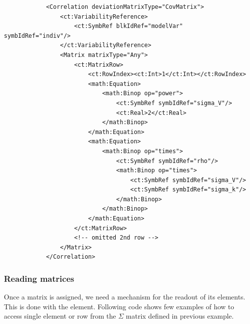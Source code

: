 \lstset{language=XML}
\begin{lstlisting}
            <Correlation deviationMatrixType="CovMatrix">
                <ct:VariabilityReference>
                    <ct:SymbRef blkIdRef="modelVar" symbIdRef="indiv"/>
                </ct:VariabilityReference>
                <Matrix matrixType="Any">
                    <ct:MatrixRow>
                        <ct:RowIndex><ct:Int>1</ct:Int></ct:RowIndex>
                        <math:Equation>
                            <math:Binop op="power">
                                <ct:SymbRef symbIdRef="sigma_V"/>
                                <ct:Real>2</ct:Real>
                            </math:Binop>
                        </math:Equation>
                        <math:Equation>
                            <math:Binop op="times">
                                <ct:SymbRef symbIdRef="rho"/>
                                <math:Binop op="times">
                                    <ct:SymbRef symbIdRef="sigma_V"/>
                                    <ct:SymbRef symbIdRef="sigma_k"/>
                                </math:Binop>
                            </math:Binop>
                        </math:Equation>
                    </ct:MatrixRow>
                    <!-- omitted 2nd row -->
                </Matrix>
            </Correlation>
\end{lstlisting}  


\subsubsection{Reading matrices}
Once a matrix is assigned, we need a mechanism for the readout of its elements. 
This is done with the  element. 
Following code shows few examples of how to access single element or 
row from the $\Sigma$ matrix defined in previous example.

